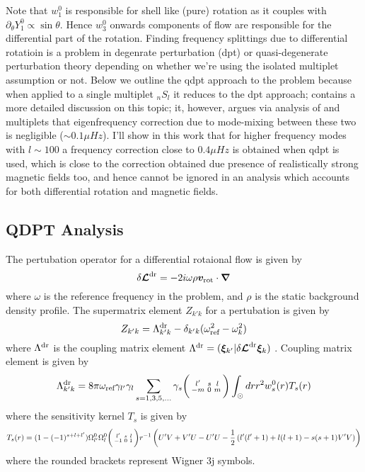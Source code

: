 Note that $w_1^0$ is responsible for shell like (pure) rotation as it couples with $\partial_{\theta} Y_1^0 \propto \sin\theta$. Hence $w_3^0$ onwards components of flow are responsible for the differential part of the rotation. Finding frequency splittings due to differential rotatioin is a problem in degenrate perturbation (dpt) or quasi-degenerate perturbation theory depending on whether we're using the isolated multiplet assumption or not. Below we outline the qdpt approach to the problem because when applied to a single multiplet $_n S_l$ it reduces to the dpt approach; \cite{lavely92} contains a more detailed discussion on this topic; it, however, argues via analysis of  and  multiplets that eigenfrequency correction due to mode-mixing between these two is negligible ($\sim 0.1 \mu Hz$). I'll show in this work that for higher frequency modes with $l\sim 100$ a frequency correction close to $0.4 \mu Hz$ is obtained when qdpt is used, which is close to the correction obtained due presence of realistically strong magnetic fields too, and hence cannot be ignored in an analysis which accounts for both differential rotation and magnetic fields.

\subsection{QDPT Analysis}
The pertubation operator \dLd for a differential rotaional flow is given by 
\begin{equation}
\delta \bm{\mathcal{L}}^{\text{dr}} = -2i \omega \rho \bm{v}_{\text{rot}} \cdot \bm{\nabla}
\end{equation}
where $\omega$ is the reference frequency in the problem, and $\rho$ is the static background density profile.
The supermatrix element $Z_{k' k}$ for a pertubation \dLd is given by
\begin{equation}
Z_{k' k} = \Lambda^{\text{dr}}_{k'k} - \delta_{k'k} (\omega_{\text{ref}}^2 - \omega_k^2)
\end{equation}
where $\Lambda^{\text{dr}}$ is the coupling matrix element $\Lambda^{\text{dr}} = (\bm{\xi}_{k'}|\delta \bm{\mathcal{L}}^{\text{dr}} \bm{\xi}_{k})$ .
Coupling matrix element is given by
\begin{equation}
\Lambda^{\text{dr}}_{k'k} = 8 \pi \omega_{\text{ref}} \gamma_{l'}\gamma_{l} \sum_{s=1,3,5,...} \gamma_{s} \bigg(\begin{smallmatrix} l' & s & l \\ -m & 0 & m \end{smallmatrix}\bigg) \int_{\odot} dr 
r^2 w_s^0(r) T_s(r)
\end{equation}
where the sensitivity kernel $T_s$ is given by
\begin{dmath}
T_s(r) = (1-(-1)^{s+l+l'}) \om{l'}{0} \om{l}{0} \wigred{-1}{0}{1} r^{-1}
 \enc{U'V+V'U-U'U-\frac{1}{2}\enc{l'(l'+1) + l(l+1) - s(s+1) V'V}}
\end{dmath}
where the rounded brackets represent Wigner 3j symbols. 

